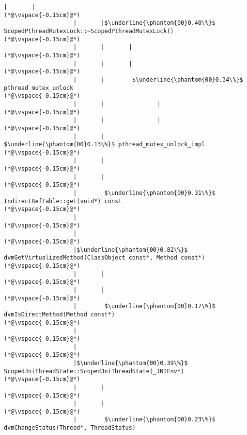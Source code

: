 \begin{lstlisting}[caption=Metodikutsu C$\to$Java 20 viiteparametrilla, label=profile:C2JBenchmark00206, numberbychapter=true, frame=lines, float, floatplacement=t]
                    |       |
(*@\vspace{-0.15cm}@*)
                    |       |$\underline{\phantom{00}0.40\%}$ ScopedPthreadMutexLock::~ScopedPthreadMutexLock()
(*@\vspace{-0.15cm}@*)
                    |       |       |
(*@\vspace{-0.15cm}@*)
                    |       |       |
(*@\vspace{-0.15cm}@*)
                    |       |        $\underline{\phantom{00}0.34\%}$ pthread_mutex_unlock
(*@\vspace{-0.15cm}@*)
                    |       |               |
(*@\vspace{-0.15cm}@*)
                    |       |               |
(*@\vspace{-0.15cm}@*)
                    |       |                $\underline{\phantom{00}0.13\%}$ pthread_mutex_unlock_impl
(*@\vspace{-0.15cm}@*)
                    |       |
(*@\vspace{-0.15cm}@*)
                    |       |
(*@\vspace{-0.15cm}@*)
                    |        $\underline{\phantom{00}0.31\%}$ IndirectRefTable::get(void*) const
(*@\vspace{-0.15cm}@*)
                    |
(*@\vspace{-0.15cm}@*)
                    |
(*@\vspace{-0.15cm}@*)
                    |$\underline{\phantom{00}0.82\%}$ dvmGetVirtualizedMethod(ClassObject const*, Method const*)
(*@\vspace{-0.15cm}@*)
                    |       |
(*@\vspace{-0.15cm}@*)
                    |       |
(*@\vspace{-0.15cm}@*)
                    |        $\underline{\phantom{00}0.17\%}$ dvmIsDirectMethod(Method const*)
(*@\vspace{-0.15cm}@*)
                    |
(*@\vspace{-0.15cm}@*)
                    |
(*@\vspace{-0.15cm}@*)
                    |$\underline{\phantom{00}0.39\%}$ ScopedJniThreadState::ScopedJniThreadState(_JNIEnv*)
(*@\vspace{-0.15cm}@*)
                    |       |
(*@\vspace{-0.15cm}@*)
                    |       |
(*@\vspace{-0.15cm}@*)
                    |        $\underline{\phantom{00}0.23\%}$ dvmChangeStatus(Thread*, ThreadStatus)

\end{lstlisting}
